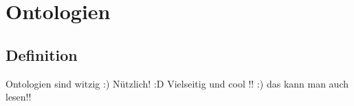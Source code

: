 \chapter{Ontologien}
\section{Definition}
Ontologien sind witzig :)
Nützlich! :D
Vielseitig und cool !!
:)
das kann man auch lesen!!\cite{bentley:1999}